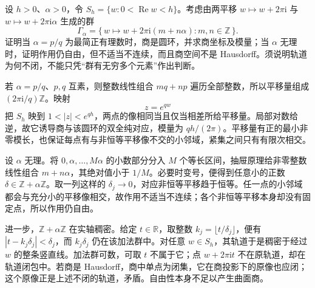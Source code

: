 \begin{exercise}\label{b3:ex:11-3}
设 \(h>0\)、\(\alpha>0\)，令 \(S_h=\{w:0<\operatorname{Re}w<h\}\)。考虑由两平移 \(w\mapsto w+2\pi\mathrm i\) 与 \(w\mapsto w+2\pi\mathrm i\alpha\) 生成的群
\[
 \Gamma_\alpha=\{\,w\mapsto w+2\pi\mathrm i(m+n\alpha)
                      :m,n\in\mathbb Z\,\}.
\]
证明当 \(\alpha=p/q\) 为最简正有理数时，商是圆环，并求商坐标及模量；当 \(\alpha\) 无理时，证明作用仍自由，但不适当不连续，而且商空间不是 Hausdorff。须说明轨道为何不闭，不能只凭“群有无穷多个元素”作出判断。
\end{exercise}
\begin{solution}
若 \(\alpha=p/q\)、\(p,q\) 互素，则整数线性组合 \(mq+np\) 遍历全部整数，所以平移量组成 \((2\pi\mathrm i/q)\mathbb Z\)。映射
\[
 z=e^{qw}
\]
把 \(S_h\) 映到 \(1<|z|<e^{qh}\)，两点的像相同当且仅当相差所给平移量。局部对数给逆，故它诱导商与该圆环的双全纯对应，模量为 \(qh/(2\pi)\)。平移量有正的最小非零模长，也保证每点有与非恒等平移像不交的小邻域，紧集之间只有有限次相交。

设 \(\alpha\) 无理。将 \(0,\alpha,\ldots,M\alpha\) 的小数部分分入 \(M\) 个等长区间，抽屉原理给非零整数线性组合 \(m+n\alpha\)，其绝对值小于 \(1/M\)。必要时变号，便得到任意小的正数 \(\delta\in\mathbb Z+\alpha\mathbb Z\)。取一列这样的 \(\delta_j\to0\)，对应非恒等平移趋于恒等。任一点的小邻域都会与充分小的平移像相交，故作用不适当不连续；各个非恒等平移本身却没有固定点，所以作用仍自由。

进一步，\(\mathbb Z+\alpha\mathbb Z\) 在实轴稠密。给定 \(t\in\mathbb R\)，取整数 \(k_j=\lfloor t/\delta_j\rfloor\)，便有 \(|t-k_j\delta_j|<\delta_j\)，而 \(k_j\delta_j\) 仍在该加法群中。对任意 \(w\in S_h\)，其轨道于是稠密于经过 \(w\) 的整条竖直线。加法群可数，可取 \(t\) 不属于它；点 \(w+2\pi\mathrm i t\) 不在原轨道，却在轨道闭包中。若商是 Hausdorff，商中单点为闭集，它在商投影下的原像也应闭；这个原像正是上述不闭的轨道，矛盾。自由性本身不足以产生曲面商。
\end{solution}

